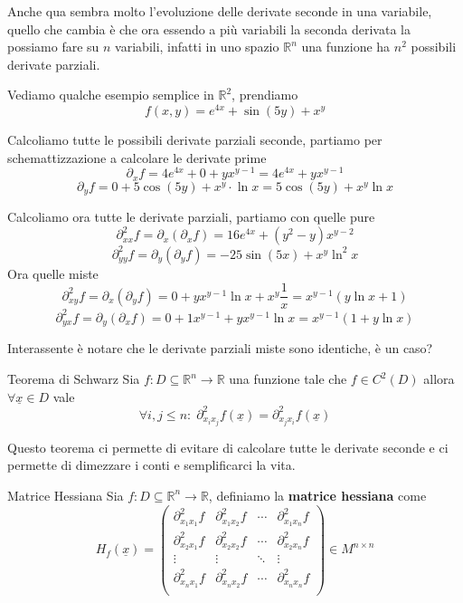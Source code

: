 \documentclass{rapport}
\begin{document}
Anche qua sembra molto l'evoluzione delle derivate seconde in una variabile, quello che cambia è che ora essendo a più variabili la seconda derivata la possiamo fare su $n$ variabili, infatti in uno spazio $\mathbb{R}^n$ una funzione ha $n^2$ possibili derivate parziali.

Vediamo qualche esempio semplice in $\mathbb{R}^2$, prendiamo 
\[
f(x,y) = e^{4x} + \sin(5y) + x^y
\]

Calcoliamo tutte le possibili derivate parziali seconde, partiamo per schemattizzazione a calcolare le derivate prime
\[
\partial_x f = 4e^{4x} + 0 + yx^{y-1} = 4e^{4x} + yx^{y-1}
\]
\[
\partial_y f = 0 + 5\cos(5y) + x^{y} \cdot \ln x= 5\cos(5y) + x^{y} \ln x
\]

Calcoliamo ora tutte le derivate parziali, partiamo con quelle pure
\[
\partial^2_{xx} f = \partial_x (\partial_x f) = 16e^{4x} + (y^2-y)x^{y-2}
\]
\[
\partial^2_{yy} f = \partial_y (\partial_y f) = -25\sin (5x) + x^y\ln^2x
\]
Ora quelle miste 
\[
\partial^2_{xy} f = \partial_x (\partial_y f) = 0 + yx^{y-1}\ln x+x^y\dfrac{1}{x} = x^{y-1} \left(y\ln x +1\right)
\]
\[
\partial^2_{yx} f = \partial_y (\partial_x f) = 0 + 1x^{y-1}+yx^{y-1}\ln x = x^{y-1} \left(1+y\ln x\right)
\]

Interassente è notare che le derivate parziali miste sono identiche, è un caso?

\begin{proposizione}{Teorema di Schwarz}{}
  Sia $f:D\subseteq\mathbb{R}^n\to \mathbb{R}$ una funzione tale che $f\in C^2(D)$ allora $\forall \underline{x} \in D$ vale
  \[
  \forall i, j\leq n : \; \partial^2_{x_ix_j} f(\underline{x}) = \partial^2_{x_jx_i} f(\underline{x}) 
  \]
\end{proposizione}

Questo teorema ci permette di evitare di calcolare tutte le derivate seconde e ci permette di dimezzare i conti e semplificarci la vita.
\newpage

\begin{definizione}{Matrice Hessiana}{}
   Sia $f:D\subseteq\mathbb{R}^n\to \mathbb{R}$, definiamo la \textbf{matrice hessiana} come 
   \[
   H_f(\underline{x}) = \begin{pmatrix}
    \partial^2_{x_1x_1} f & \partial^2_{x_1x_2} f & \cdots & \partial^2_{x_1x_n} f \\
     \partial^2_{x_2x_1} f & \partial^2_{x_2x_2} f & \cdots & \partial^2_{x_2x_n} f \\
     \vdots  & \vdots & \ddots & \vdots \\
     \partial^2_{x_nx_1} f & \partial^2_{x_nx_2} f& \cdots & \partial^2_{x_nx_n} f \\
   \end{pmatrix} \in M^{n\times n}
   \]
\end{definizione}
\end{document}
